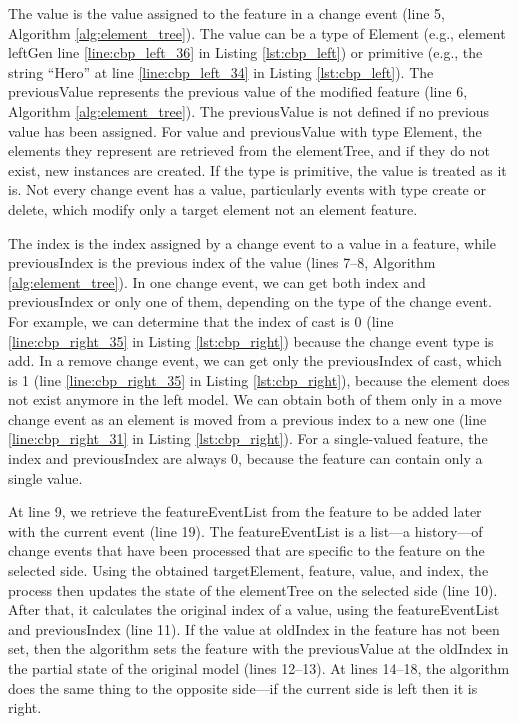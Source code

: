The \textsf{value} is the value assigned to the feature in a change event (line 5, Algorithm \ref{alg:element_tree}). The \textsf{value} can be a type of \textsf{Element} (e.g., element \textsf{leftGen} line \ref{line:cbp_left_36} in Listing \ref{lst:cbp_left}) or primitive (e.g., the string “Hero” at line \ref{line:cbp_left_34} in Listing \ref{lst:cbp_left}). The \textsf{previousValue} represents the previous value of the modified feature (line 6, Algorithm \ref{alg:element_tree}). The \textsf{previousValue} is not defined if no previous value has been assigned. For \textsf{value} and \textsf{previousValue} with type \textsf{Element}, the elements they represent are retrieved from the \textsf{elementTree}, and if they do not exist, new instances are created. If the type is primitive, the value is treated as it is. Not every change event has a \textsf{value}, particularly events with type \textsf{create}
or \textsf{delete}, which modify only a target element not an element feature.

The \textsf{index} is the index assigned by a change event to a value in a feature, while \textsf{previousIndex} is the previous index of the value (lines 7–8, Algorithm \ref{alg:element_tree}). In one change event, we can get both \textsf{index} and \textsf{previousIndex} or only one of them, depending on the type of the change event. For example, we can determine that the \textsf{index} of \textsf{cast} is 0 (line \ref{line:cbp_right_35} in Listing \ref{lst:cbp_right}) because the change event type is \textsf{add}. In a \textsf{remove} change event, we can get only the \textsf{previousIndex} of \textsf{cast}, which is 1 (line \ref{line:cbp_right_35} in Listing \ref{lst:cbp_right}), because the element does not exist anymore in the left model. We can obtain both of them only in a \textsf{move} change event as an element is moved from a previous index to a new one (line \ref{line:cbp_right_31} in Listing \ref{lst:cbp_right}). For a single-valued feature, the \textsf{index} and \textsf{previousIndex} are always 0, because the feature can contain only a single value.

At line 9, we retrieve the \textsf{featureEventList} from the \textsf{feature} to be added later with the current \textsf{event} (line 19). The \textsf{featureEventList} is a list—a history—of change events that have been processed that are specific to the \textsf{feature} on the selected \textsf{side}. Using the obtained \textsf{targetElement}, \textsf{feature}, \textsf{value}, and \textsf{index}, the process then updates the state of the \textsf{elementTree} on the selected \textsf{side} (line 10). After that, it calculates the original index of a value, using the \textsf{featureEventList} and \textsf{previousIndex} (line 11). If the value at \textsf{oldIndex} in the \textsf{feature} has not been set, then the algorithm sets the \textsf{feature} with the \textsf{previousValue} at the \textsf{oldIndex} in the partial state of the original model (lines 12–13). At lines 14–18, the algorithm does the same thing to the opposite side—if the current \textsf{side} is \textsf{left} then it is \textsf{right}.

